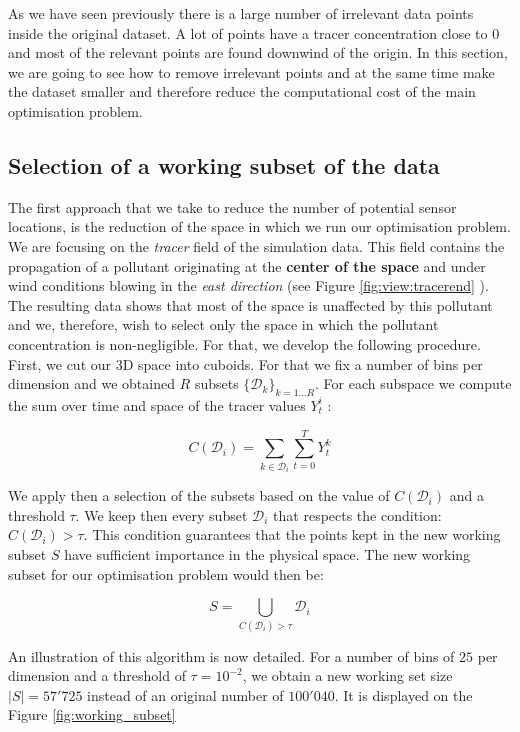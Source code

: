As we have seen previously there is a large number of irrelevant data points inside the original dataset. A lot of points have a tracer concentration close to $0$ and most of the relevant points are found downwind of the origin. In this section, we are going to see how to remove irrelevant points and at the same time make the dataset smaller and therefore reduce the computational cost of the main optimisation problem. 

\subsection{Selection of a working subset of the data}
The first approach that we take to reduce the number of potential sensor locations, is the reduction of the space in which we run our optimisation problem. We are focusing on the \textit{tracer} field of the simulation data. This field contains the propagation of a pollutant originating at the \textbf{center of the space} and under wind conditions blowing in the \textit{east direction} (see Figure \ref{fig:view:tracerend} ). The resulting data shows that most of the space is unaffected by this pollutant and we, therefore, wish to select only the space in which the pollutant concentration is non-negligible. For that, we develop the following procedure. \\

First, we cut our 3D space into cuboids. For that we fix a number of bins per dimension and we obtained $R$ subsets $\{\mathcal{D}_k\}_{k=1 \dots R} $. For each subspace we compute the sum over time and space of the tracer values $Y_t^i$ : 

\begin{equation}
    C(\mathcal{D}_i) = \sum_{k \in \mathcal{D}_i} \sum_{t = 0}^T Y_t^k
\end{equation}

We apply then a selection of the subsets based on the value of $C(\mathcal{D}_i)$ and a  threshold $\tau$. We keep then every subset $\mathcal{D}_i$ that respects the condition: $C(\mathcal{D}_i) > \tau$. This condition guarantees that the points kept in the new working subset $S$ have sufficient importance in the physical space. The new working subset for our optimisation problem would then be: 

\begin{equation}
    S = \bigcup_{C(\mathcal{D}_i) > \tau} \mathcal{D}_i
\end{equation} 

An illustration of this algorithm is now detailed. For a number of bins of $25$ per dimension and a threshold of $\tau = 10^{-2}$, we obtain a new working set size $|S| = 57'725$ instead of an original number of $100'040$. It is displayed on the Figure \ref{fig:working_subset}


